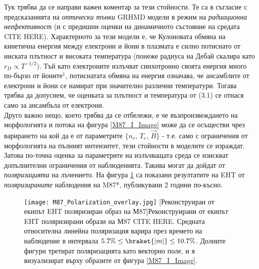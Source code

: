 Тук трябва да се направи важен коментар за тези стойности. Те са в съгласие с предсказанията на \emph{оптически тънки} GRHMD модели в режим на \emph{радиационна неефективност} (и с предишни оценки на динамичното състояние на средата CITE HERE). Характерното за тези модели е, че Кулоновата обмяна на кинетична енергия между електрони и йони в плазмата е силно потиснато от ниската плътност и високата температура (понеже радиуса на Дебай скалира като $r_D \propto T^{-1/2}$). Тъй като електроните излъчват синхотронно своята енергия много по-бързо от йоните$^1$, потиснатата обмяна на енергия означава, че ансамблите от електрони и йони се намират при значително различни температури. Тогава трябва да допуснем, че оценката за плътност и температура от (3.1) се отнася само за ансамбъла от електрони.\\

Друго важно нещо, което трябва да се отбележи, е че възпроизвеждането на морфологията и потока на фигура \ref{M87_I_Image} може да се осъществи чрез варирането на кой да е от параметрите $\{n_{e},\,T_{e},\, \vec{B}\}$ - т.е. само с ограничения от морфологията на пълният интензитет, тези стойности в моделите се израждат. Затова по-точна оценка за параметрите на излъчващата среда се изискват допълнителни ограничения от наблюденията. Такива могат да дойдат от \emph{поляризацията} на лъчението. На фигура \ref{M87_Pol_Image} са показани резултатите на EHT от \emph{поляризираните} наблюдения на M87*, публикувани 2 години по-късно.\\

 \begin{figure}[h!]{
 \centering
 \texttt{[image: M87\_Polarization\_overlay.jpg]}\newline
 [Реконструиран от екипът EHT поляризиран образ на М87]{Реконструирани от екипът EHT поляризирани образи на М87 CITE HERE. Средната относителна линейна поляризация варира през времето на наблюдение в интервала $5.7\% \le \braket{|m|} \le 10.7\%$. Долните фигури третират поляризацията като векторно поле, и я визуализират върху образите от фигура \ref{M87_I_Image}.} 
 \label{M87_Pol_Image}}
 \end{figure}
 \setlength{\footskip}{20pt}
 
